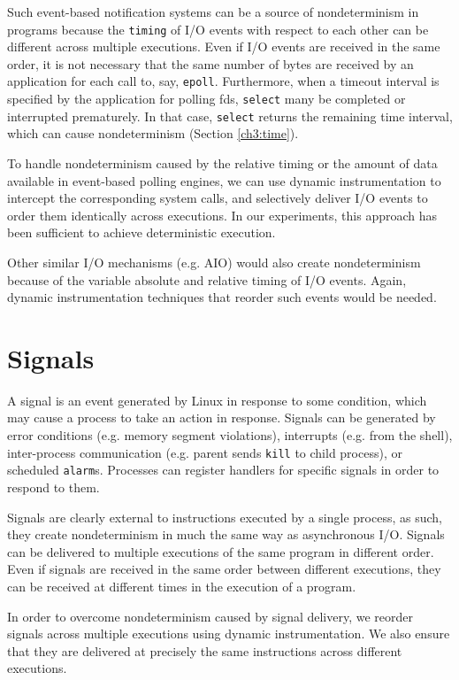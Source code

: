 Such event-based notification systems can be a source
of nondeterminism in programs because the
\texttt{timing} of I/O events with respect to each other
can be different across multiple executions.
Even if I/O events are received in the same order,
it is not necessary that the same number of bytes are
received by an application for each call
to, say, \texttt{epoll}. Furthermore, when a timeout
interval is specified by the application for polling fds,
\texttt{select} many be completed or interrupted
prematurely. In that case, \texttt{select} returns
the remaining time interval, which can
cause nondeterminism (Section \ref{ch3:time}).

To handle nondeterminism caused by the relative
timing or the amount of data available 
in event-based polling engines, we 
can use dynamic instrumentation to intercept
the corresponding system calls, and
selectively deliver I/O events to order them
identically across executions. 
In our experiments, this approach has been sufficient to 
achieve deterministic execution.

Other similar I/O mechanisms (e.g. AIO) 
would also create nondeterminism because of the
variable absolute and relative timing of I/O events.
Again, dynamic instrumentation techniques that 
reorder such events would be needed.

\section{Signals}\label{ch3:sig}
A signal is an event generated by Linux
in response to some condition, which may cause
a process to take an action in response.
Signals can be generated by error conditions
(e.g. memory segment violations), 
interrupts (e.g. from the shell), 
inter-process communication (e.g. parent 
sends \texttt{kill} to child process),
or scheduled \texttt{alarm}s. 
Processes can register
handlers for specific signals in order
to respond to them.

Signals are clearly external to
instructions executed by a single process,
as such, they create nondeterminism in
much the same way as asynchronous I/O.
Signals can be delivered to multiple executions
of the same program in different order.
Even if signals are received in the
same order between different executions,
they can be received at different times
in the execution of a program.

In order to overcome nondeterminism caused
by signal delivery, we reorder signals 
across multiple executions using
dynamic instrumentation.
We also ensure that they are delivered 
at precisely the same instructions
across different executions.

